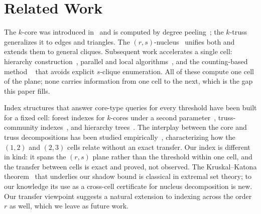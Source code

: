 \section{Related Work}
\label{sec:related}

The $k$-core was introduced in~\cite{seidman1983network} and is computed by degree peeling~\cite{batagelj2011fast}; the $k$-truss~\cite{cohen2008trusses, wang2012truss} generalizes it to edges and triangles.
%
The $(r,s)$-nucleus~\cite{firstNucleus, nuclearTWEB} unifies both and extends them to general cliques.
%
Subsequent work accelerates a single cell: hierarchy construction~\cite{fastHierarchy, sotaHierarchy}, parallel and local algorithms~\cite{sotaPrveHierarchy, LocalNuclear}, and the counting-based method \cnd~\cite{LocalNuclear} that avoids explicit $s$-clique enumeration.
%
All of these compute one cell of the plane; none carries information from one cell to the next, which is the gap this paper fills.

Index structures that answer core-type queries for every threshold have been built for a fixed cell: forest indexes for $k$-cores under a second parameter~\cite{io-eff}, truss-community indexes~\cite{huang2014truss, akbas2017truss}, and hierarchy trees~\cite{sotaHierarchy}.
%
The interplay between the core and truss decompositions has been studied empirically~\cite{malliaros2020core2}, characterizing how the $(1,2)$ and $(2,3)$ cells relate without an exact transfer.
%
Our index is different in kind: it spans the $(r,s)$ plane rather than the threshold within one cell, and the transfer between cells is exact and proved, not observed.
%
The Kruskal--Katona theorem~\cite{kruskal1963number, katona1968theorem, lovaszKK} that underlies our shadow bound is classical in extremal set theory; to our knowledge its use as a cross-cell certificate for nucleus decomposition is new.
%
Our transfer viewpoint suggests a natural extension to indexing across the order $r$ as well, which we leave as future work.
